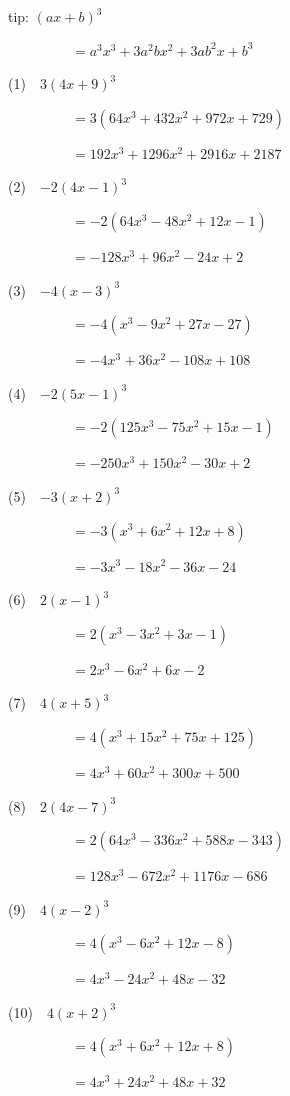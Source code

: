 \documentclass[a4j,twocolumn,10pt,fleqn]{jarticle}
\begin{document}
tip: $\left(a x + b\right)^{3}$

~~~~~~~~~$=a^{3} x^{3} + 3 a^{2} b x^{2} + 3 a b^{2} x + b^{3}$


(1)~~$3\left(4 x + 9\right)^{3}$

~~~~~~~~~$=3(64 x^{3} + 432 x^{2} + 972 x + 729)$

~~~~~~~~~$=192 x^{3} + 1296 x^{2} + 2916 x + 2187$

(2)~~$-2\left(4 x - 1\right)^{3}$

~~~~~~~~~$=-2(64 x^{3} - 48 x^{2} + 12 x - 1)$

~~~~~~~~~$=- 128 x^{3} + 96 x^{2} - 24 x + 2$

(3)~~$-4\left(x - 3\right)^{3}$

~~~~~~~~~$=-4(x^{3} - 9 x^{2} + 27 x - 27)$

~~~~~~~~~$=- 4 x^{3} + 36 x^{2} - 108 x + 108$

(4)~~$-2\left(5 x - 1\right)^{3}$

~~~~~~~~~$=-2(125 x^{3} - 75 x^{2} + 15 x - 1)$

~~~~~~~~~$=- 250 x^{3} + 150 x^{2} - 30 x + 2$

(5)~~$-3\left(x + 2\right)^{3}$

~~~~~~~~~$=-3(x^{3} + 6 x^{2} + 12 x + 8)$

~~~~~~~~~$=- 3 x^{3} - 18 x^{2} - 36 x - 24$

(6)~~$2\left(x - 1\right)^{3}$

~~~~~~~~~$=2(x^{3} - 3 x^{2} + 3 x - 1)$

~~~~~~~~~$=2 x^{3} - 6 x^{2} + 6 x - 2$

(7)~~$4\left(x + 5\right)^{3}$

~~~~~~~~~$=4(x^{3} + 15 x^{2} + 75 x + 125)$

~~~~~~~~~$=4 x^{3} + 60 x^{2} + 300 x + 500$

(8)~~$2\left(4 x - 7\right)^{3}$

~~~~~~~~~$=2(64 x^{3} - 336 x^{2} + 588 x - 343)$

~~~~~~~~~$=128 x^{3} - 672 x^{2} + 1176 x - 686$

(9)~~$4\left(x - 2\right)^{3}$

~~~~~~~~~$=4(x^{3} - 6 x^{2} + 12 x - 8)$

~~~~~~~~~$=4 x^{3} - 24 x^{2} + 48 x - 32$

(10)~~$4\left(x + 2\right)^{3}$

~~~~~~~~~$=4(x^{3} + 6 x^{2} + 12 x + 8)$

~~~~~~~~~$=4 x^{3} + 24 x^{2} + 48 x + 32$
\end{document}
